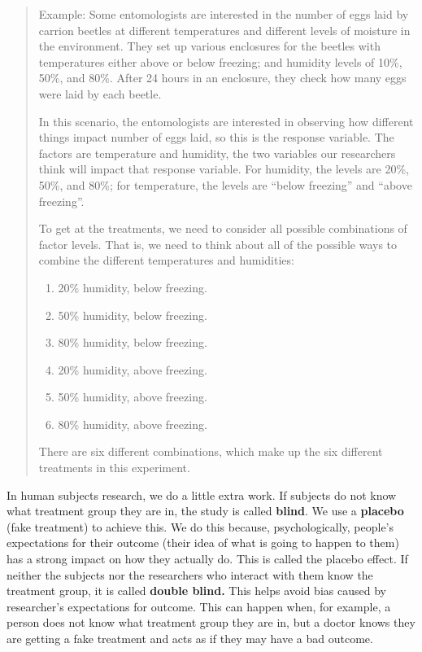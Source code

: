 \documentclass[
]{book}
\providecommand{\tightlist}{%
  \setlength{\itemsep}{0pt}\setlength{\parskip}{0pt}}
\begin{document}
\begin{quote}
Example: Some entomologists are interested in the number of eggs laid by carrion beetles at different temperatures and different levels of moisture in the environment. They set up various enclosures for the beetles with temperatures either above or below freezing; and humidity levels of 10\%, 50\%, and 80\%. After 24 hours in an enclosure, they check how many eggs were laid by each beetle.

In this scenario, the entomologists are interested in observing how different things impact number of eggs laid, so this is the response variable. The factors are temperature and humidity, the two variables our researchers think will impact that response variable. For humidity, the levels are 20\%, 50\%, and 80\%; for temperature, the levels are ``below freezing'' and ``above freezing''.

To get at the treatments, we need to consider all possible combinations of factor levels. That is, we need to think about all of the possible ways to combine the different temperatures and humidities:

\begin{enumerate}
\def\labelenumi{\arabic{enumi}.}
\tightlist
\item
  20\% humidity, below freezing.
\item
  50\% humidity, below freezing.
\item
  80\% humidity, below freezing.
\item
  20\% humidity, above freezing.
\item
  50\% humidity, above freezing.
\item
  80\% humidity, above freezing.
\end{enumerate}

There are six different combinations, which make up the six different treatments in this experiment.
\end{quote}

In human subjects research, we do a little extra work. If subjects do not know what treatment group they are in, the study is called \textbf{blind}. We use a \textbf{placebo} (fake treatment) to achieve this. We do this because, psychologically, people's expectations for their outcome (their idea of what is going to happen to them) has a strong impact on how they actually do. This is called the placebo effect. If neither the subjects nor the researchers who interact with them know the treatment group, it is called \textbf{double blind.} This helps avoid bias caused by researcher's expectations for outcome. This can happen when, for example, a person does not know what treatment group they are in, but a doctor knows they are getting a fake treatment and acts as if they may have a bad outcome.
\end{document}
